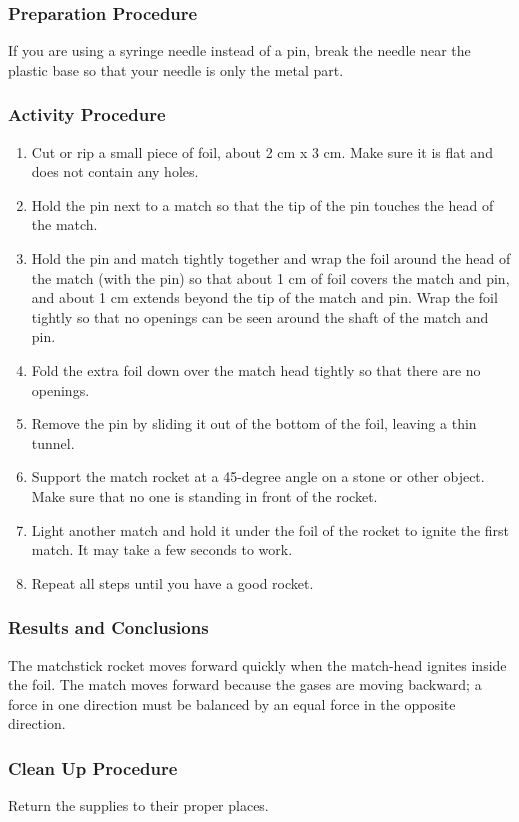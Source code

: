 \subsubsection*{Preparation Procedure}
If you are using a syringe needle instead of a pin, break the needle near the plastic base so that your needle is only the metal part.

\subsubsection*{Activity Procedure}
\begin{enumerate}
\item{Cut or rip a small piece of foil, about 2 cm x 3 cm. Make sure it is flat and does not contain any holes.} 
\item{Hold the pin next to a match so that the tip of the pin touches the head of the match.} 
\item{Hold the pin and match tightly together and wrap the foil around the head of the match (with the pin) so that about 1 cm of foil covers the match and pin, and about 1 cm extends beyond the tip of the match and pin. Wrap the foil tightly so that no openings can be seen around the shaft of the match and pin.} 
\item{Fold the extra foil down over the match head tightly so that there are no openings.} 
\item{Remove the pin by sliding it out of the bottom of the foil, leaving a thin tunnel.} 
\item{Support the match rocket at a 45-degree angle on a stone or other object. Make sure that no one is standing in front of the rocket.} 
\item{Light another match and hold it under the foil of the rocket to ignite the first match. It may take a few seconds to work.} 
\item{Repeat all steps until you have a good rocket.} 
\end{enumerate}

\subsubsection*{Results and Conclusions}
The matchstick rocket moves forward quickly when the match-head ignites inside the foil.  The match moves forward because the gases are moving backward; a force in one direction must be balanced by an equal force in the opposite direction.  

\subsubsection*{Clean Up Procedure}
Return the supplies to their proper places.

